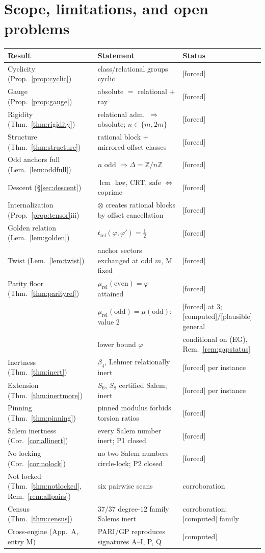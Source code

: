 \documentclass[11pt]{article}
\theoremstyle{plain}
\theoremstyle{definition}
\theoremstyle{remark}
\newcommand{\Z}{\mathbb{Z}}
\newcommand{\Mah}{\mathrm{M}}
\DeclareMathOperator{\lcm}{lcm}
\newcommand{\F}{\textnormal{[forced]}}
\newcommand{\C}{\textnormal{[computed]}}
\newcommand{\Pl}{\textnormal{[plausible]}}
\begin{document}
\section{Scope, limitations, and open problems}\label{sec:open}

\begin{center}
\small
\begin{tabular}{p{4.9cm}p{5.6cm}p{3.6cm}}
\hline
Result & Statement & Status\\
\hline
Cyclicity (Prop.~\ref{prop:cyclic}) & class/relational groups cyclic & \F\\
Gauge (Prop.~\ref{prop:gauge}) & absolute $=$ relational $+$ ray & \F\\
Rigidity (Thm.~\ref{thm:rigidity}) & relational adm.\ $\Rightarrow$ absolute; $n\in\{m,2m\}$ & \F\\
Structure (Thm.~\ref{thm:structure}) & rational block $+$ mirrored offset classes & \F\\
Odd anchors full (Lem.~\ref{lem:oddfull}) & $n$ odd $\Rightarrow\Delta=\Z/n\Z$ & \F\\
Descent (\S\ref{sec:descent}) & $\lcm$ law, CRT, safe $\Leftrightarrow$ coprime & \F\\
Internalization (Prop.~\ref{prop:tensor}iii) & $\otimes$ creates rational blocks by offset cancellation & \F\\
Golden relation (Lem.~\ref{lem:golden}) & $t_{\mathrm{rel}}(\varphi,\varphi')=\tfrac12$ & \F\\
Twist (Lem.~\ref{lem:twist}) & anchor sectors exchanged at odd $m$, $\Mah$ fixed & \F\\
Parity floor (Thm.~\ref{thm:parityrel}) & $\mu_{\mathrm{rel}}(\text{even})=\varphi$ attained & \F\\
 & $\mu_{\mathrm{rel}}(\text{odd})=\mu(\text{odd})$; value $2$ & \F{} at $3$; \C/\Pl{} general\\
 & lower bound $\varphi$ & conditional on (EG), Rem.~\ref{rem:gapstatus}\\
Inertness (Thm.~\ref{thm:inert}) & $\beta_4$, Lehmer relationally inert & \F{} per instance\\
Extension (Thm.~\ref{thm:inertmore}) & $S_6$, $S_8$ certified Salem; inert & \F{} per instance\\
Pinning (Thm.~\ref{thm:pinning}) & pinned modulus forbids torsion ratios & \F\\
Salem inertness (Cor.~\ref{cor:allinert}) & every Salem number inert; P1 closed & \F\\
No locking (Cor.~\ref{cor:nolock}) & no two Salem numbers circle-lock; P2 closed & \F\\
Not locked (Thm.~\ref{thm:notlocked}, Rem.~\ref{rem:allpairs}) & six pairwise scans & corroboration\\
Census (Thm.~\ref{thm:census}) & $37/37$ degree-$12$ family Salems inert & corroboration; \C{} family\\
Cross-engine (App.~A, entry M) & PARI/GP reproduces signatures A--I, P, Q & \C\\
\hline
\end{tabular}
\end{center}
\end{document}
